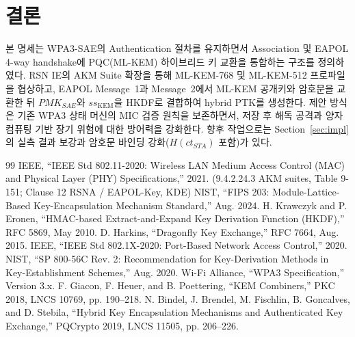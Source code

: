 \documentclass[11pt]{article}
\newcommand{\ctSTA}{\ensuremath{ct_{STA}}}
\newcommand{\ssK}{\ensuremath{ss_{\mathrm{KEM}}}}
\newcommand{\pmkSAE}{\ensuremath{PMK_{SAE}}}
\theoremstyle{definition}
\theoremstyle{plain}
\begin{document}
\section{결론}
본 명세는 WPA3-SAE의 Authentication 절차를 유지하면서 Association 및 EAPOL 4-way
handshake에 PQC(ML-KEM) 하이브리드 키 교환을 통합하는 구조를 정의하였다. RSN
IE의 AKM Suite 확장을 통해 ML-KEM-768 및 ML-KEM-512 프로파일을 협상하고, EAPOL
Message~1과 Message~2에서 ML-KEM 공개키와 암호문을 교환한 뒤 \pmkSAE{}와
\ssK{}을 HKDF로 결합하여 hybrid PTK를 생성한다. 제안 방식은 기존 WPA3 상태
머신의 MIC 검증 원칙을 보존하면서, 저장 후 해독 공격과 양자 컴퓨팅 기반 장기
위험에 대한 방어력을 강화한다. 향후 작업으로는 Section~\ref{sec:impl}의 실측
결과 보강과 암호문 바인딩 강화($H(\ctSTA)$ 포함)가 있다.

\begin{thebibliography}{99}
 IEEE, ``IEEE Std 802.11-2020: Wireless LAN Medium Access
  Control (MAC) and Physical Layer (PHY) Specifications,'' 2021.
  (9.4.2.24.3 AKM suites, Table 9-151; Clause 12 RSNA / EAPOL-Key, KDE)
 NIST, ``FIPS 203: Module-Lattice-Based Key-Encapsulation
  Mechanism Standard,'' Aug. 2024.
 H. Krawczyk and P. Eronen, ``HMAC-based Extract-and-Expand
  Key Derivation Function (HKDF),'' RFC 5869, May 2010.
 D. Harkins, ``Dragonfly Key Exchange,'' RFC 7664, Aug. 2015.
 IEEE, ``IEEE Std 802.1X-2020: Port-Based Network Access
  Control,'' 2020.
 NIST, ``SP 800-56C Rev. 2: Recommendation for Key-Derivation
  Methods in Key-Establishment Schemes,'' Aug. 2020.
 Wi-Fi Alliance, ``WPA3 Specification,'' Version 3.x.
 F. Giacon, F. Heuer, and B. Poettering, ``KEM Combiners,''
  PKC 2018, LNCS 10769, pp. 190--218.
 N. Bindel, J. Brendel, M. Fischlin, B. Goncalves, and
  D. Stebila, ``Hybrid Key Encapsulation Mechanisms and Authenticated Key
  Exchange,'' PQCrypto 2019, LNCS 11505, pp. 206--226.
\end{thebibliography}
\end{document}
